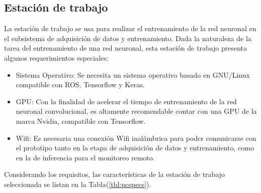     \subsection{Estación de trabajo}
    La estación de trabajo se usa para realizar el entrenamiento de la red neuronal en el subsistema de adquisición de datos y 
    entrenamiento. Dada la naturaleza de la tarea del entrenamiento de una red neuronal, esta estación de trabajo presenta algunos 
    requerimientos especiales: 

    \begin{itemize}
        \item Sistema Operativo: Se necesita un sistema operativo basado en GNU/Linux compatible con ROS, Tensorflow y Keras.
        \item GPU: Con la finalidad de acelerar el tiempo de entrenamiento de la red neuronal convolucional, es altamente recomendable contar con una GPU de la marca Nvidia, compatible con Tensorflow.
        \item Wifi: Es necesaria una conexión Wifi inalámbrica para poder comunicarse con el prototipo tanto en la etapa de adquisición de datos y entrenamiento, como en la de inferencia para el monitoreo remoto.
    \end{itemize}
    
    Considerando los requisitos, las características de la estación de trabajo seleccionada se listan en la Tabla(\ref{tbl:pcspecs}). 

    \begin{table}[!h]
        \centering
        \caption{Características de la estación de trabajo seleccionada. }
        \label{tbl:pcspecs}
        \end{table}

